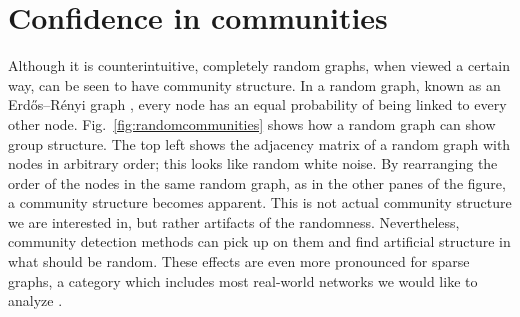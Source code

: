 \hypertarget{confidence-in-communities}{\section{Confidence in
communities}\label{confidence-in-communities}}

\protect\hyperlink{confidence-in-communities}{}

Although it is counterintuitive, completely random graphs, when viewed a
certain way, can be seen to have community structure. In a random graph,
known as an Erdős--Rényi graph \autocite{erdos_evolution_1960}, every
node has an equal probability of being linked to every other node.
Fig.~\ref{fig:randomcommunities} shows how a random graph can show group
structure. The top left shows the adjacency matrix of a random graph
with nodes in arbitrary order; this looks like random white noise. By
rearranging the order of the nodes in the same random graph, as in the
other panes of the figure, a community structure becomes apparent. This
is not actual community structure we are interested in, but rather
artifacts of the randomness. Nevertheless, community detection methods
can pick up on them and find artificial structure in what should be
random. These effects are even more pronounced for sparse graphs, a
category which includes most real-world networks we would like to
analyze \autocite{fortunato_community_2016}.

